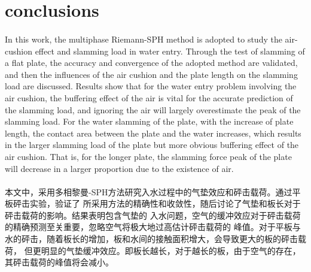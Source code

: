 \documentclass[UTF8]{ctexart}
\begin{document}
\section{conclusions}
\paragraph{\quad}In this work, the multiphase Riemann-SPH method is adopted to 
        study the air-cushion effect and slamming load in water entry. Through 
        the test of slamming of a flat plate, the accuracy and convergence of 
        the adopted method are validated, and then the influences of the air cushion 
        and the plate length on the slamming load are discussed. Results show that for 
        the water entry problem involving the air cushion, the buffering effect of the 
        air is vital for the accurate prediction of the slamming load, and ignoring the 
        air will largely overestimate the peak of the slamming load. For the water slamming 
        of the plate, with the increase of plate length, the contact area between the plate 
        and the water increases, which results in the larger slamming load of the plate but 
        more obvious buffering effect of the air cushion. That is, for the longer plate, the 
        slamming force peak of the plate will decrease in a larger proportion due to the existence of air.
\paragraph{\quad}本文中，采用多相黎曼-SPH方法研究入水过程中的气垫效应和砰击载荷。通过平板砰击实验，验证了
                所采用方法的精确性和收敛性，随后讨论了气垫和板长对于砰击载荷的影响。结果表明包含气垫的
                入水问题，空气的缓冲效应对于砰击载荷的精确预测至关重要，忽略空气将极大地过高估计砰击载荷的
                峰值。对于平板与水的砰击，随着板长的增加，板和水间的接触面积增大，会导致更大的板的砰击载荷，
                但更明显的气垫缓冲效应。即板长越长，对于越长的板，由于空气的存在，其砰击载荷的峰值将会减小。
\end{document}
